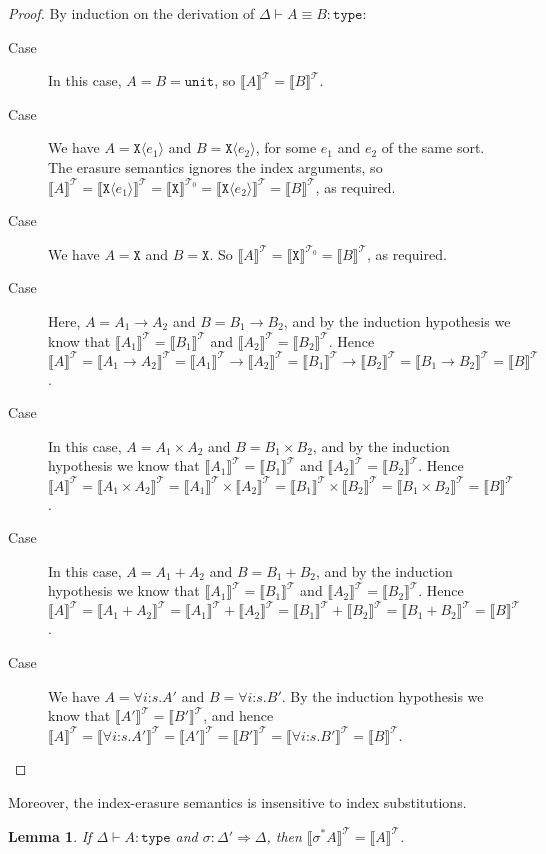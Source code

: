\documentclass[natbib,preprint]{sigplanconf}
\newcommand{\sortType}{\texttt{type}}
\newcommand{\tyUnit}{\texttt{unit}}
\newcommand{\tyPrim}[2]{\texttt{#1}\langle #2 \rangle}
\newcommand{\tyPrimNm}[1]{\texttt{#1}}
\newcommand{\tyArr}{\to}
\newcommand{\tyProduct}{\times}
\newcommand{\tySem}[1]{\llbracket #1 \rrbracket^{\mathcal{T}}}
\newcommand{\tyPrimSem}[1]{\llbracket \tyPrimNm{#1} \rrbracket^{\mathcal{T}_0}}
\newtheorem{lemma}{Lemma}
\begin{document}
\begin{proof}
  By induction on the derivation of $\Delta \vdash A \equiv B :
  \sortType$:
  \begin{description}
  \item[Case ] In this case, $A = B = \tyUnit$, so
    $\tySem{A} = \tySem{B}$.
  \item[Case ] We have $A = \tyPrim{X}{e_1}$ and
    $B = \tyPrim{X}{e_2}$, for some $e_1$ and $e_2$ of the same
    sort. The erasure semantics ignores the index arguments, so
    $\tySem{A} = \tySem{\tyPrim{X}{e_1}} = \tyPrimSem{X} =
    \tySem{\tyPrim{X}{e_2}} = \tySem{B}$, as required.
  \item[Case ] We have $A = \tyPrimNm{X}$ and
    $B = \tyPrimNm{X}$. So $\tySem{A} = \tyPrimSem{X} = \tySem{B}$, as
    required.
  \item[Case ] Here, $A = A_1 \tyArr A_2$ and $B =
    B_1 \tyArr B_2$, and by the induction hypothesis we know that
    $\tySem{A_1} = \tySem{B_1}$ and $\tySem{A_2} = \tySem{B_2}$. Hence
    $\tySem{A} = \tySem{A_1 \tyArr A_2} = \tySem{A_1} \to \tySem{A_2}
    = \tySem{B_1} \to \tySem{B_2} = \tySem{B_1 \tyArr B_2} =
    \tySem{B}$.
  \item[Case ] In this case, $A = A_1 \tyProduct
    A_2$ and $B = B_1 \tyProduct B_2$, and by the induction hypothesis
    we know that $\tySem{A_1} = \tySem{B_1}$ and $\tySem{A_2} =
    \tySem{B_2}$. Hence $\tySem{A} = \tySem{A_1 \tyProduct A_2} =
    \tySem{A_1} \times \tySem{A_2} = \tySem{B_1} \times \tySem{B_2} =
    \tySem{B_1 \tyProduct B_2} = \tySem{B}$.
  \item[Case ] In this case, $A = A_1 + A_2$ and $B =
    B_1 + B_2$, and by the induction hypothesis we know that
    $\tySem{A_1} = \tySem{B_1}$ and $\tySem{A_2} = \tySem{B_2}$. Hence
    $\tySem{A} = \tySem{A_1 + A_2} = \tySem{A_1} + \tySem{A_2} =
    \tySem{B_1} + \tySem{B_2} = \tySem{B_1 + B_2} = \tySem{B}$.
  \item[Case ] We have $A = \forall
    i\mathord:s.A'$ and $B = \forall i\mathord:s.B'$. By the induction
    hypothesis we know that $\tySem{A'} = \tySem{B'}$, and hence
    $\tySem{A} = \tySem{\forall i\mathord:s. A'} = \tySem{A'} =
    \tySem{B'} = \tySem{\forall i\mathord:s. B'} = \tySem{B}$.
  \end{description}
\end{proof}

Moreover, the index-erasure semantics is insensitive to index
substitutions.
\begin{lemma}\label{lem:tysubst-erasure}
  If $\Delta \vdash A : \sortType$ and $\sigma : \Delta' \Rightarrow
  \Delta$, then $\tySem{\sigma^*A} = \tySem{A}$.
\end{lemma}
\end{document}
